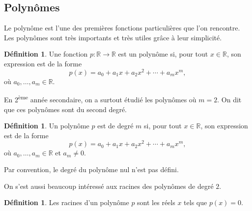 \documentclass[12pt,a4paper]{article}
\theoremstyle{plain}
\theoremstyle{definition}
\newtheorem{definition}[theorem]{Définition}
\theoremstyle{remark}
\begin{document}
\subsection{Polynômes}

Le polynôme est l'une des premières fonctions particulières que l'on rencontre.
Les polynômes sont très importants et très utiles grâce à leur simplicité.

\begin{tcolorbox}[navybar]
  \begin{definition}
    Une fonction $p : \mathbb{R} \rightarrow \mathbb{R}$ est un polynôme
    si, pour tout $x \in \mathbb{R}$, son expression est de la forme
    \[
    p(x) = a_0 + a_1 x + a_2 x^2 + \cdots + a_m x^m,
    \]
    où $a_0, \dots, a_m \in \mathbb{R}$.
  \end{definition}
\end{tcolorbox}

En 2\textsuperscript{ème} année secondaire, on a surtout étudié les polynômes où
$m = 2$. On dit que ces polynômes sont du second degré.

\begin{tcolorbox}[navybar]
  \begin{definition}
    Un polynôme $p$ est de degré $m$ si, pour tout $x \in \mathbb{R}$,
    son expression est de la forme
    \[
    p(x) = a_0 + a_1 x + a_2 x^2 + \cdots + a_m x^m,
    \]
    où $a_0, \dots, a_m \in \mathbb{R}$ et $a_m \neq 0$.
    
    Par convention, le degré du polynôme nul n'est pas défini.
  \end{definition}
\end{tcolorbox}

On s'est aussi beaucoup intéressé aux racines des polynômes de degré $2$.

\begin{tcolorbox}[navybar]
  \begin{definition}
    Les racines d'un polynôme $p$ sont les réels $x$ tels que $p(x) = 0$.
  \end{definition}
\end{tcolorbox}
\end{document}
